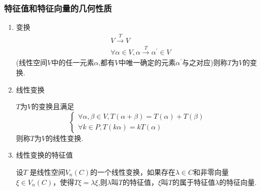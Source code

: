 \subsubsection{特征值和特征向量的几何性质}
\begin{enumerate}
	\item \textcolor{ecolor}{变换}
	\[
	  \begin{split}
	    &V\stackrel{T}{\longrightarrow}V	\\
	    &\forall\alpha\in V,\alpha \stackrel{T}{\longrightarrow}\alpha^{'} \in V
	 \end{split}
	\]
	(线性空间$V$中的任一元素$\alpha$,都有$V$中唯一确定的元素$\alpha^{'}$与之对应)则称$T$为$V$的变换.
	\item \textcolor{ecolor}{线性变换}
	
	$T$为$V$的变换且满足
	\[
	\left\{
	\begin{array}{l}
		\forall \alpha,\beta \in V, T(\alpha+\beta)= T(\alpha)+T(\beta)\\
	\forall k \in P, T(k\alpha)=kT(\alpha)
	\end{array} \right.
	\]
	则称$T$为$V$的线性变换.

	\item  \textcolor{ecolor}{线性变换的特征值}
	\begin{definition}
		设$T$ 是线性空间$V_n(C)$的一个线性变换，如果存在$\lambda\in C$和非零向量$\xi\in V_n(C)$，使得$T\xi=\lambda\xi$,则$\lambda$叫$T$的特征值，$\xi$叫$T$的属于特征值$\lambda$的特征向量.
	\end{definition}
	

\end{enumerate}
